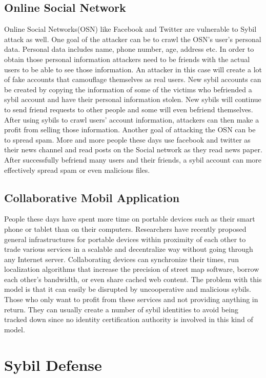 \documentclass[conference]{IEEEtran}
\begin{document}
\subsection{Online Social Network}
Online Social Networks(OSN) like Facebook and Twitter are vulnerable to Sybil attack as well. One goal of the attacker can be to crawl the OSN's user's personal data.
Personal data includes name, phone number, age, address etc. In order to obtain those personal information
attackers need to be friends with the actual users to be able to see those information.
An attacker in this case will create a lot of fake accounts that camouflage themselves as real users. New sybil accounts can be created by copying the information of some of the victims
who befriended a sybil account and have their personal information stolen. New sybils will continue to send friend requests to other people and some will even befriend themselves.
After using sybils to crawl users' account information, attackers can then make a profit from selling those information. Another goal of attacking the OSN can be to spread spam.
More and more people these days use facebook and twitter as their news channel and read posts on the Social network as they read news paper. 
After successfully befriend many users and their friends, a sybil account can more effectively spread spam or even malicious files.

\subsection{Collaborative Mobil Application}
People these days have spent more time on portable devices such as their smart phone or tablet than on their computers.
Researchers have recently proposed general infrastructures for portable devices within proximity of each other to trade various services
in a scalable and decentralize way without going through any Internet server. Collaborating devices can synchronize their times, run localization algorithms 
that increase the precision of street map software, borrow each other's bandwidth, or even share cached web content. The problem with this model is that it can 
easily be disrupted by uncooperative and malicious sybils. Those who only want to profit from these services and not providing anything in return.
They can usually create a number of sybil identities to avoid being tracked down since no identity certification authority is involved in this kind of model.\cite{quercia10mobile}

\section{Sybil Defense} \label{SybilDefense}
\end{document}
